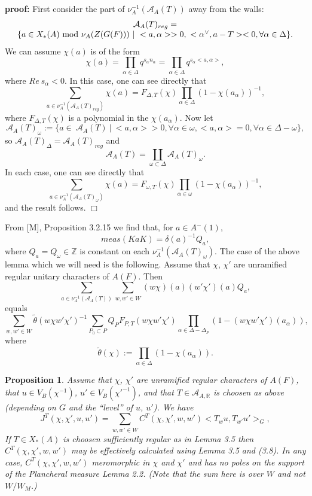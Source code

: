 \documentclass[12pt]{article}
\newtheorem{proposition}[lemma]{Proposition}
\newenvironment{pf}[1][proof:]{\par\medskip\noindent\textbf{#1} }{\par\medskip}
\begin{document}
\begin{pf}
First consider the part of $\nu_A^{-1}(\mathcal{A}_A(T))$ away from the walls:
\[
\begin{array}{c}
\mathcal{A}_A(T)_{reg}=\\
\{a\in X_*(A)\ {\rm mod}\ \nu_A(Z(G(F)))\ |\ <a,\alpha>>0,\ <\alpha^\vee,a-T><0,\forall\alpha\in\Delta\}.
\end{array}
\]
We can assume $\chi(a)$ is of the form
\[
\chi(a)=\prod_{\alpha\in\Delta}q^{s_\alpha n_\alpha}=\prod_{\alpha\in\Delta}q^{s_\alpha<a,\alpha>},
\]
where $Re\ s_\alpha<0$. In this case, one can see directly that
\[
\sum_{a\in\nu_A^{-1}(\mathcal{A}_A(T)_{reg})}\chi(a)=F_{\Delta,T}(\chi)\prod_{\alpha\in\Delta}(1-\chi(a_\alpha))^{-1},
\]
where $F_{\Delta,T}(\chi)$ is a polynomial in the $\chi(a_\alpha)$. Now let
\[
\mathcal{A}_A(T)_\omega:=\{a\in\ \mathcal{A}_A(T)\ |\ <a,\alpha>>0,\forall\alpha\in\omega,<a,\alpha>=0,\forall\alpha\in\Delta-\omega\},
\]
so $\mathcal{A}_A(T)_\Delta=\mathcal{A}_A(T)_{reg}$ and
\begin{equation}\tag{3.5}
\mathcal{A}_A(T)=\coprod_{\omega\subset\Delta}\mathcal{A}_A(T)_\omega.
\end{equation}
In each case, one can see directly that
\begin{equation}\tag{3.6}
\sum_{a\in\nu_A^{-1}(\mathcal{A}_A(T)_\omega)}\chi(a)=F_{\omega,T}(\chi)\prod_{\alpha\in\omega}(1-\chi(a_\alpha))^{-1},
\end{equation}
and the result follows. $\Box$
\end{pf}

From [M], Proposition 3.2.15 we find that, for $a\in A^-(1)$,
\begin{equation}\tag{3.7}
meas(KaK)=\delta(a)^{-1}Q_a,
\end{equation}
where $Q_a=Q_\omega\in\mathbb{Z}$ is constant on each $\nu_A^{-1}(\mathcal{A}_A(T)_\omega)$. The case of the above lemma which we will need is the following. Assume that $\chi$, $\chi'$ are unramified regular unitary characters of $A(F)$. Then
\[
\sum_{a\in\nu_A^{-1}(\mathcal{A}_A(T))}\sum_{w,w'\in W}(w\chi)(a)(w'\chi')(a)Q_a,
\]
equals
\begin{equation}\tag{3.8}
\sum_{w,w'\in W}\tilde\theta(w\chi w'\chi')^{-1}\sum_{P_0\subset P}Q_PF_{P,T}(w\chi w'\chi')\prod_{\alpha\in\Delta-\Delta_P}(1-(w\chi w'\chi')(a_\alpha)),
\end{equation}
where
\[
\tilde\theta(\chi):=\prod_{\alpha\in\Delta}(1-\chi(a_\alpha)).
\]

\begin{proposition}
Assume that $\chi$, $\chi'$ are unramified regular characters of $A(F)$, that $u\in V_B(\chi^{-1})$, $u'\in V_B(\chi'^{-1})$, and that $T\in\mathcal{A}_{A,\mathbb{R}}$ is choosen as above (depending on $G$ and the ``level'' of $u$, $u'$). We have
\[
J^T(\chi,\chi',u,u')=\sum_{w,w'\in W}C^T(\chi,\chi',w,w')<T_wu,T_{w'}u'>_G,
\]
If $T\in X_*(A)$ is choosen sufficiently regular as in Lemma 3.5 then $C^T(\chi,\chi',w,w')$ may be effectively calculated using Lemma 3.5 and (3.8). In any case, $C^T(\chi,\chi',w,w')$ meromorphic in $\chi$ and $\chi'$ and has no poles on the support of the Plancheral measure Lemma 2.2. (Note that the sum here is over $W$ and not $W/W_M$.)
\end{proposition}
\end{document}
